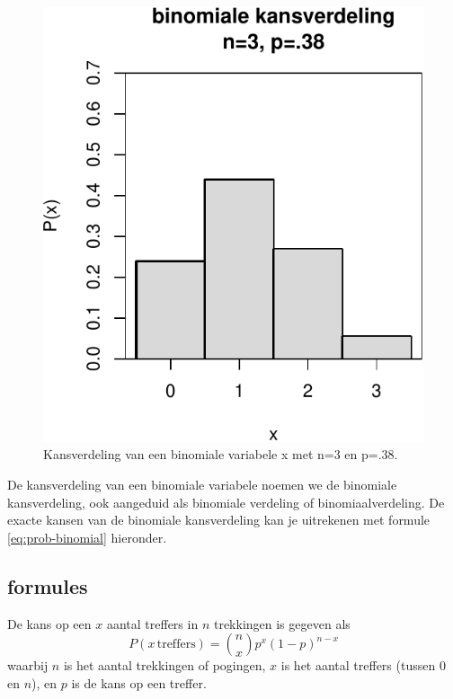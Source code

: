 \documentclass[
]{book}
\begin{document}
\begin{figure}
\centering
\includegraphics{KMS-NL_files/figure-latex/binomkansverdeling3-1.pdf}
\caption{\label{fig:binomkansverdeling3}Kansverdeling van een binomiale variabele x met n=3 en p=.38.}
\end{figure}

De kansverdeling van een binomiale variabele noemen we de binomiale
kansverdeling, ook aangeduid als binomiale verdeling of
binomiaalverdeling. De exacte kansen van de binomiale kansverdeling kan
je uitrekenen met formule \eqref{eq:prob-binomial} hieronder.

\hypertarget{formules}{%
\subsection{formules}\label{formules}}

De kans op een \(x\) aantal treffers in \(n\) trekkingen is gegeven als
\begin{equation}
  P(x\,\mbox{treffers}) = {n \choose x} p^x (1-p)^{n-x}
  \label{eq:prob-binomial}
\end{equation}
waarbij \(n\) is het aantal trekkingen of pogingen, \(x\) is het aantal treffers (tussen
0 en \(n\)), en \(p\) is de kans op een treffer.
\end{document}

